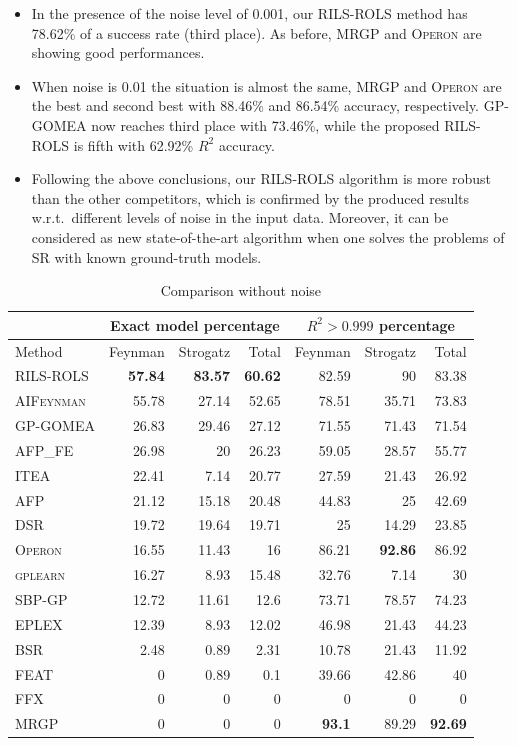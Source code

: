 \documentclass[a4paper,12pt]{elsarticle}
\begin{document}
\begin{itemize}
	\item  In the presence of the noise level of 0.001, our \textsc{RILS-ROLS} method has 78.62\% of a success rate (third place).  As before, \textsc{MRGP} and \textsc{Operon} are showing good performances. 
	
	\item   When noise is 0.01 the situation is almost the same, \textsc{MRGP} and \textsc{Operon} are the best and second best with 88.46\% and 86.54\% accuracy, respectively. \textsc{GP-GOMEA} now reaches third place with 73.46\%, while the proposed \textsc{RILS-ROLS} is fifth with 62.92\% $R^2$ accuracy.
	
	\item Following the above conclusions, our \textsc{RILS}-\textsc{ROLS} algorithm is more robust than the other competitors, which is confirmed by the produced results w.r.t.\ different levels of noise in the input data. Moreover, it can be considered as new state-of-the-art algorithm when one solves the problems of SR with known ground-truth models. 
	
\end{itemize}

\begin{table}[!htb]
	\caption{Comparison without noise}\label{tab:comp_noise0}
	\centering
	\begin{tabular}{l|rrr|rrr} \hline
		& \multicolumn{3}{c|}{Exact model percentage} & \multicolumn{3}{c}{$R^2 > 0.999$ percentage}\\ \hline
		Method & Feynman & Strogatz & Total & Feynman & Strogatz & Total \\ \hline
		\textsc{RILS-ROLS}&\bf{57.84}&\bf{83.57}&\bf{60.62}&82.59&90&83.38\\
		\textsc{AIFeynman}&55.78&27.14&52.65&78.51&35.71&73.83\\
		\textsc{GP-GOMEA}&26.83&29.46&27.12&71.55&71.43&71.54\\
		\textsc{AFP\_FE}&26.98&20&26.23&59.05&28.57&55.77\\
		\textsc{ITEA}&22.41&7.14&20.77&27.59&21.43&26.92\\
		\textsc{AFP}&21.12&15.18&20.48&44.83&25&42.69\\
		\textsc{DSR}&19.72&19.64&19.71&25&14.29&23.85\\
		\textsc{Operon}&16.55&11.43&16&86.21&\bf{92.86}&86.92\\
		\textsc{gplearn}&16.27&8.93&15.48&32.76&7.14&30\\
		\textsc{SBP-GP}&12.72&11.61&12.6&73.71&78.57&74.23\\
		\textsc{EPLEX}&12.39&8.93&12.02&46.98&21.43&44.23\\
		\textsc{BSR}&2.48&0.89&2.31&10.78&21.43&11.92\\
		\textsc{FEAT}&0&0.89&0.1&39.66&42.86&40\\
		\textsc{FFX}&0&0&0&0&0&0\\
		\textsc{MRGP}&0&0&0&\bf{93.1}&89.29&\bf{92.69}\\
		\hline
	\end{tabular}
\end{table}
\end{document}
